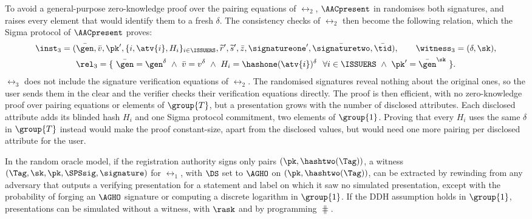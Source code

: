To avoid a general-purpose zero-knowledge proof over the pairing equations of
$\rel_2$, $\AACpresent$ in  randomises both signatures, and
raises every element that would identify them to a fresh $\delta$. The
consistency checks of $\rel_2$ then become the following relation, which the
Sigma protocol of $\AACpresent$ proves:
%
\begin{equation}\label{eq:agg-creds-proof-rel}\begin{gathered}
%
  \inst_3 = (\bar{\gen}, \bar{v}, \pk', \{i, \atv{i}, H_i\}_{i\in\ISSUERS},
\widetilde{r}', \widetilde{s}', \bar{z}, \signatureone', \bar{\signaturetwo},
\bar{\tid}), \qquad \witness_3 = (\delta, \sk), \\
%
  \rel_3 = \{\ \bar{\gen} = \gen^\delta \ \wedge\ \bar{v} = v^\delta \ \wedge\
H_i = \hashone(\atv{i})^\delta\ \ \forall i \in \ISSUERS \ \wedge\ \pk' =
\bar{\gen}^\sk\ \}.
%
\end{gathered}\end{equation}
%
$\rel_3$ does not include the signature verification equations of $\rel_2$. The
randomised signatures reveal nothing about the original ones, so the user sends
them in the clear and the verifier checks their verification equations directly. The proof is then
efficient, with no zero-knowledge proof over pairing equations or elements of
$\group{T}$, but a presentation grows with the number of disclosed attributes. Each disclosed attribute adds its blinded hash $H_i$ and
one Sigma protocol commitment, two elements of $\group{1}$. Proving that every
$H_i$ uses the same $\delta$ in $\group{T}$ instead would make the proof
constant-size, apart from the disclosed values, but would need one more pairing
per disclosed attribute for the user.

\begin{lemma}\label{lem:agg-creds-sigma}

  In the random oracle model, if the registration authority signs only pairs
$(\pk, \hashtwo(\Tag))$, a witness $(\Tag, \sk, \pk, \SPSsig, \signature)$ for
$\rel_1$, with $\DS$ set to $\AGHO$ on $(\pk, \hashtwo(\Tag))$, can be extracted
by rewinding from any adversary that outputs a verifying presentation for a
statement and label on which it saw no simulated presentation, except with the
probability of forging an $\AGHO$ signature or computing a discrete logarithm
in $\group{1}$. If the DDH assumption holds in $\group{1}$, presentations can
be simulated without a witness, with $\rask$ and by programming $\hash$.

\end{lemma}


